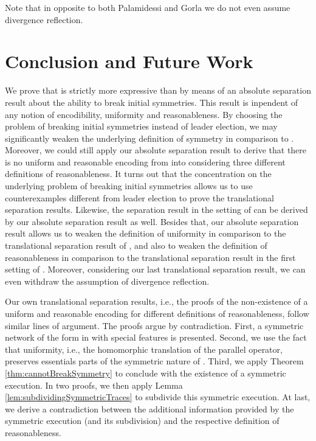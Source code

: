 \documentclass[11pt,techReport]{eptcs}
\begin{document}
Note that in opposite to both Palamidessi and Gorla we do not even assume divergence reflection.








\section{Conclusion and Future Work} \label{sec:conclusion}

We prove that \pimix is strictly more expressive than \pisep by means of an absolute separation result about the ability to break initial symmetries. This result is inpendent of any notion of encodibility, uniformity and reasonableness. By choosing the problem of breaking initial symmetries instead of leader election, we may significantly weaken the underlying definition of symmetry in comparison to \cite{palamidessi03}.  Moreover, we could still apply our absolute separation result to derive that there is no uniform and reasonable encoding from \pimix into \pisep considering three different definitions of reasonableness.  It turns out that the concentration on the underlying problem of breaking initial symmetries allows us to use counterexamples different from leader election to prove the translational separation results. Likewise, the separation result in the setting of \cite{gorla08d} can be derived by our absolute separation result as well. Besides that, our absolute separation result allows us to weaken the definition of uniformity in comparison to the translational separation result of \cite{palamidessi03}, and also to weaken the definition of reasonableness in comparison to the translational separation result in the first setting of \cite{gorla08d}.  Moreover, considering our last translational separation result, we can even withdraw the assumption of divergence reflection.

Our own translational separation results, i.e., the proofs of the non-existence of a uniform and reasonable encoding for different definitions of reasonableness, follow similar lines of argument. The proofs argue by contradiction. First, a symmetric network of the form  in \procmix with special features is presented.  Second, we use the fact that uniformity, i.e., the homomorphic translation of the parallel operator, preserves essentials parts of the symmetric nature of .  Third, we apply Theorem \ref{thm:cannotBreakSymmetry} to conclude with the existence of a symmetric execution. In two proofs, we then apply Lemma \ref{lem:subdividingSymmetricTraces} to subdivide this symmetric execution. At last, we derive a contradiction between the additional information provided by the symmetric execution (and its subdivision) and the respective definition of reasonableness.
\end{document}

